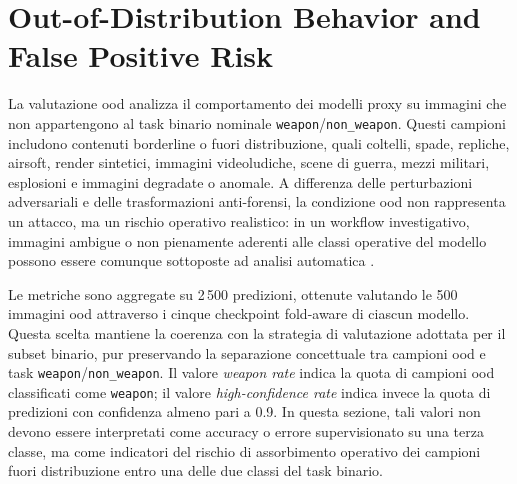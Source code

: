 \section{Out-of-Distribution Behavior and False Positive Risk}
\label{sec:results-ood}

La valutazione \gls{ood} analizza il comportamento dei modelli proxy su immagini
che non appartengono al task binario nominale
\texttt{weapon}/\texttt{non\_weapon}. Questi campioni includono contenuti
borderline o fuori distribuzione, quali coltelli, spade, repliche, airsoft,
render sintetici, immagini videoludiche, scene di guerra, mezzi militari,
esplosioni e immagini degradate o anomale. A differenza delle perturbazioni
adversariali e delle trasformazioni anti-forensi, la condizione \gls{ood} non
rappresenta un attacco, ma un rischio operativo realistico: in un workflow
investigativo, immagini ambigue o non pienamente aderenti alle classi operative
del modello possono essere comunque sottoposte ad analisi automatica
\cite{hendrycks2017baseline,liang2018odin,fort2021exploring}.

Le metriche sono aggregate su 2\,500 predizioni, ottenute valutando le 500
immagini \gls{ood} attraverso i cinque checkpoint fold-aware di ciascun modello.
Questa scelta mantiene la coerenza con la strategia di valutazione adottata per
il subset binario, pur preservando la separazione concettuale tra campioni
\gls{ood} e task \texttt{weapon}/\texttt{non\_weapon}. Il valore
\emph{weapon rate} indica la quota di campioni \gls{ood} classificati come
\texttt{weapon}; il valore \emph{high-confidence rate} indica invece la quota di
predizioni con confidenza almeno pari a 0.9. In questa sezione, tali valori non
devono essere interpretati come accuracy o errore supervisionato su una terza
classe, ma come indicatori del rischio di assorbimento operativo dei campioni
fuori distribuzione entro una delle due classi del task binario.

